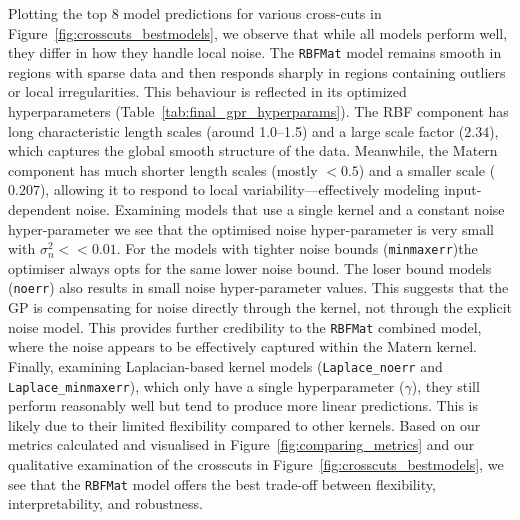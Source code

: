 \documentclass{ucdgradtaughtthesis}
\begin{document}
Plotting the top 8 model predictions for various cross-cuts in Figure~\ref{fig:crosscuts_bestmodels}, we observe that while all models perform well, they differ in how they handle local noise.
The \texttt{RBFMat} model remains smooth in regions with sparse data and then responds sharply in regions containing outliers or local irregularities.
This behaviour is reflected in its optimized hyperparameters (Table~\ref{tab:final_gpr_hyperparams}). The RBF component has long characteristic length scales (around 1.0--1.5) and a large scale factor ($2.34$),
which captures the global smooth structure of the data. Meanwhile, the Matern component has much shorter length scales (mostly $< 0.5$) and a smaller scale ($0.207$), allowing it to respond to local variability—effectively modeling input-dependent noise.
Examining models that use a single kernel and a constant noise hyper-parameter we see that the optimised noise hyper-parameter is very small with \(\sigma_n^2 << 0.01\). For the models with tighter noise bounds (\texttt{minmaxerr})the optimiser always opts for the same lower noise bound. The loser bound models (\texttt{noerr})
also results in small noise hyper-parameter values. This suggests that the GP is compensating for noise directly through the kernel, not through the explicit noise model. This provides further credibility to the \texttt{RBFMat} combined model, where the noise appears to be effectively captured within the Matern kernel.
Finally, examining Laplacian-based kernel models (\texttt{Laplace\_noerr} and \texttt{Laplace\_minmaxerr}), which only have a single hyperparameter ($\gamma$), they still perform reasonably well but tend to produce more linear predictions. This is likely due to their limited flexibility compared to other kernels.
Based on our metrics calculated and visualised in Figure~\ref{fig:comparing_metrics} and our qualitative examination of the crosscuts in Figure~\ref{fig:crosscuts_bestmodels}, we see that the \texttt{RBFMat} model offers the best trade-off between flexibility, interpretability, and robustness.
%
\end{document}
